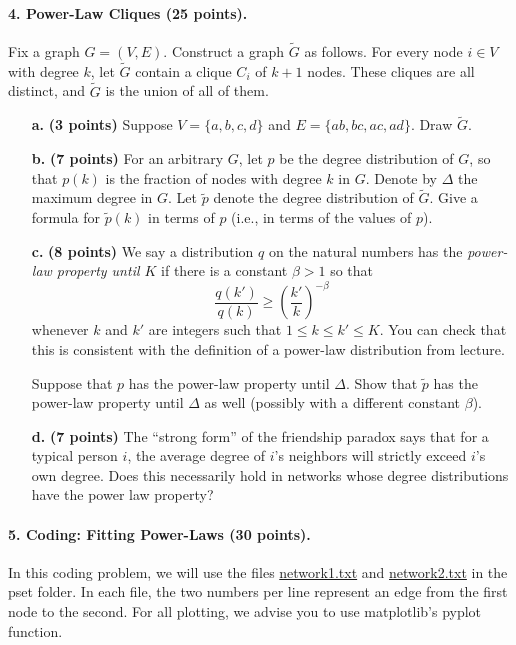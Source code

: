 \documentclass[11pt]{article} %
\begin{document}
\paragraph{4. Power-Law Cliques (25 points).}
Fix a graph $G=(V,E)$. Construct a graph $\widetilde{G}$ as follows. For every node $i \in V$ with degree $k$, let $\widetilde{G}$ contain a clique $C_i$ of $k+1$ nodes. These cliques are all distinct, and $\widetilde{G}$ is the union of all of them.
\begin{enumerate} 
	\item[\textbf{a.}] \textbf{(3 points)}  Suppose $V=\{a,b,c,d\}$ and $E=\{ab,bc,ac,ad\}$. Draw $\widetilde{G}$.
	\item[\textbf{b.}] \textbf{(7 points)} For an arbitrary $G$, let $p$ be the degree distribution of $G$, so that $p(k)$ is the fraction of nodes with degree $k$ in $G$. Denote by $\Delta$ the maximum degree in $G$. Let $\widetilde{p}$ denote the degree distribution of $\widetilde{G}$. Give a formula for $\widetilde{p}(k)$ in terms of $p$ (i.e., in terms of the values of $p$). 
	\item[\textbf{c.}] \textbf{(8 points)} We say a distribution $q$ on the natural numbers has the \emph{power-law property until $K$} if there is a constant $\beta>1$ so that $$ \frac{q(k')}{q(k)} \geq \left(\frac{k'}{k}\right)^{-\beta}$$ whenever $k$ and $k'$ are integers such that $1 \leq k \leq k' \leq K$. You can check that this is consistent with the definition of a power-law distribution from lecture.
	
	Suppose that $p$ has the power-law property until $\Delta$. Show that $\widetilde{p}$ has the power-law property until $\Delta$ as well (possibly with a different constant $\beta$).
	\item[\textbf{d.}] \textbf{(7 points)} The ``strong form'' of the friendship paradox says that for a typical person $i$, the average degree of $i$'s neighbors will strictly exceed $i$'s own degree. Does this necessarily hold in networks whose degree distributions have the power law property? 
\end{enumerate}

\paragraph{5. Coding: Fitting Power-Laws (30 points).}
In this coding problem, we will use the files \href{http://www.hcs.harvard.edu/~cs134-spring2017/wp-content/uploads/2017/02/network1.txt}{network1.txt} and \href{http://www.hcs.harvard.edu/~cs134-spring2017/wp-content/uploads/2017/02/network2.txt}{network2.txt} in the pset folder. In each file, the two numbers per line represent an edge from the first node to the second. For all plotting, we advise you to use matplotlib's pyplot function.
\end{document}
